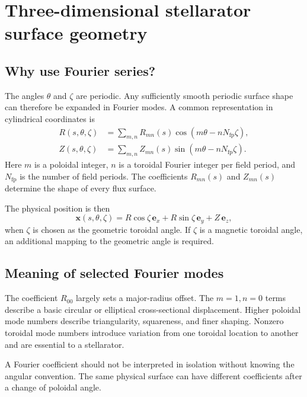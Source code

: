 \section{Three-dimensional stellarator surface geometry}
\label{sec:fourier_geometry}

\subsection{Why use Fourier series?}
The angles $\theta$ and $\zeta$ are periodic. Any sufficiently smooth periodic surface shape can therefore be expanded in Fourier modes. A common representation in cylindrical coordinates is
\begin{align}
R(s,\theta,\zeta)
&=\sum_{m,n}R_{mn}(s)
\cos\left(m\theta-nN_{\mathrm{fp}}\zeta\right),
\label{eq:R_fourier}\\
Z(s,\theta,\zeta)
&=\sum_{m,n}Z_{mn}(s)
\sin\left(m\theta-nN_{\mathrm{fp}}\zeta\right).
\label{eq:Z_fourier}
\end{align}
Here $m$ is a poloidal integer, $n$ is a toroidal Fourier integer per field period, and $N_{\mathrm{fp}}$ is the number of field periods. The coefficients $R_{mn}(s)$ and $Z_{mn}(s)$ determine the shape of every flux surface.

The physical position is then
\begin{equation}
\mathbf x(s,\theta,\zeta)
=R\cos\zeta\,\mathbf e_x
+R\sin\zeta\,\mathbf e_y
+Z\,\mathbf e_z,
\label{eq:x_from_RZ}
\end{equation}
when $\zeta$ is chosen as the geometric toroidal angle. If $\zeta$ is a magnetic toroidal angle, an additional mapping to the geometric angle is required.

\subsection{Meaning of selected Fourier modes}
The coefficient $R_{00}$ largely sets a major-radius offset. The $m=1,n=0$ terms describe a basic circular or elliptical cross-sectional displacement. Higher poloidal mode numbers describe triangularity, squareness, and finer shaping. Nonzero toroidal mode numbers introduce variation from one toroidal location to another and are essential to a stellarator.

A Fourier coefficient should not be interpreted in isolation without knowing the angular convention. The same physical surface can have different coefficients after a change of poloidal angle.

